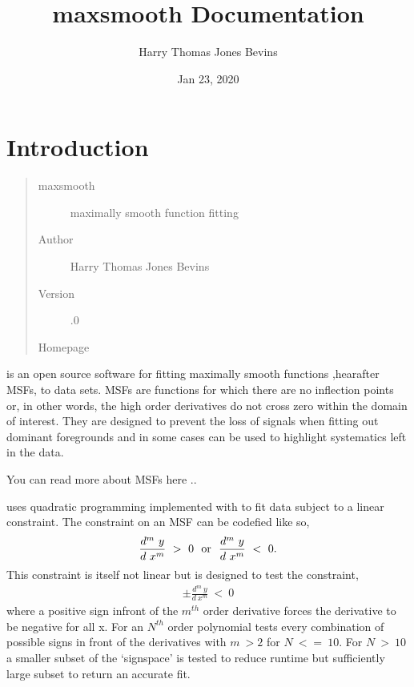 \documentclass[letterpaper,10pt,english]{sphinxmanual}
\title{maxsmooth Documentation}
\date{Jan 23, 2020}
\author{Harry Thomas Jones Bevins}
\begin{document}
\pagestyle{empty}
\sphinxmaketitle
\pagestyle{plain}
\sphinxtableofcontents
\pagestyle{normal}
\label{\detokenize{source/index::doc}}



\chapter{Introduction}
\label{\detokenize{source/intro:introduction}}\begin{quote}\begin{description}
\item[{maxsmooth}] \leavevmode
maximally smooth function fitting

\item[{Author}] \leavevmode
Harry Thomas Jones Bevins

\item[{Version}] .0

\item[{Homepage}] \leavevmode
{}

\end{description}\end{quote}

 is an open source software for fitting maximally smooth functions
,hearafter MSFs, to data sets. MSFs are functions for which there are no
inflection points or, in other words, the high order derivatives do not cross
zero within the domain of interest. They are designed to prevent the loss of
signals when fitting out dominant foregrounds and in some cases can be used to
highlight systematics left in the data.

You can read more about MSFs here ..

 uses quadratic programming implemented with  to fit
data subject to a linear constraint. The constraint on an MSF can be codefied
like so,
\begin{equation*}
\begin{split}\frac{d^m~y}{d~x^m}~>~0~~\textnormal{or}~~\frac{d^m~y}{d~x^m}~<~0.\end{split}
\end{equation*}
This constraint is itself not linear but  is designed to test the
constraint,
\begin{equation*}
\begin{split}\pm \frac{d^m~y}{d~x^m}~<~0\end{split}
\end{equation*}
where a positive sign infront of the \(m^{th}\) order derivative forces the derivative
to be negative for all x. For an \(N^{th}\) order polynomial  tests
every combination of possible signs in front of the derivatives with \(m~>2\) for
\(N~<=~10\). For \(N~>~10\) a smaller subset of the ‘sign\sphinxhyphen{}space’ is
tested to reduce runtime but sufficiently large subset to return an accurate
fit.
\end{document}
